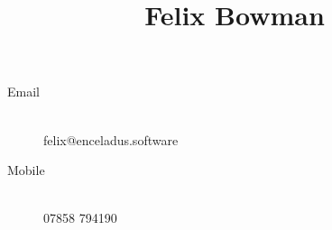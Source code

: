 \documentclass[10pt]{article}
\title{\vspace{-16ex}\sffamily\bfseries\huge Felix Bowman \vspace{-6ex}}
\date{}
\begin{document}
\noindent\makebox[\linewidth]{\rule{\textwidth}{0.4pt}}
\begin{minipage}{0.74\textwidth}
\begingroup
\let\center\flushleft
\let\endcenter\endflushleft
\maketitle
\endgroup
\end{minipage}


\vspace{1em}
\begin{minipage}[ht]{0.48\textwidth}
    \begin{description}
        \item[Email] \hfill \\
            felix@enceladus.software
        \item[Mobile] \hfill \\
            07858 794190
    \end{description}
\end{minipage}
\end{document}
